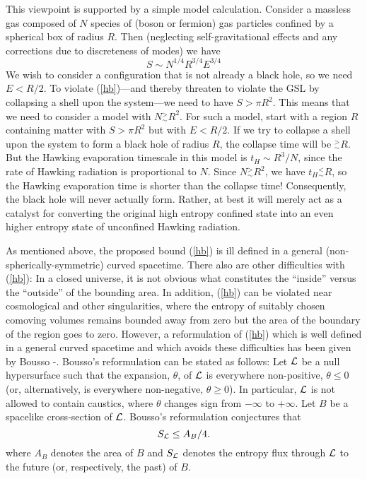 This viewpoint is supported by a simple model calculation.  Consider a
massless gas composed of $N$ species of (boson or fermion) gas
particles confined by a spherical box of radius $R$. Then (neglecting
self-gravitational effects and any corrections due to discreteness of
modes) we have
\begin{equation}
S \sim N^{1/4} R^{3/4} E^{3/4}
\label{sgas}
\end{equation}
We wish to consider a configuration that is not already a black hole,
so we need $E < R/2$. To violate (\ref{hb})---and thereby threaten to
violate the GSL by collapsing a shell upon the system---we need to
have $S > \pi R^2$. This means that we need to consider a model with
$N \mathrel{{}^>_\sim} R^2$. For such a model, start with a region $R$
containing matter with $S > \pi R^2$ but with $E < R/2$. If we try to
collapse a shell upon the system to form a black hole of radius $R$,
the collapse time will be $\mathrel{{}^>_\sim} R$. But the Hawking
evaporation timescale in this model is $t_H \sim R^3/N$, since the rate
of Hawking radiation is proportional to $N$. Since $N
\mathrel{{}^>_\sim} R^2$, we have $t_H \mathrel{{}^<_\sim} R$, so the
Hawking evaporation time is shorter than the collapse
time! Consequently, the black hole will never actually form. Rather,
at best it will merely act as a catalyst for converting the original high
entropy confined state into an even higher entropy state of unconfined
Hawking radiation.

As mentioned above, the proposed bound (\ref{hb}) is ill defined in a
general (non-spherically-symmetric) curved spacetime. There also are
other difficulties with (\ref{hb}): In a closed universe, it is not
obvious what constitutes the ``inside'' versus the ``outside'' of the
bounding area. In addition, (\ref{hb}) can be violated near
cosmological and other singularities, where the entropy of suitably
chosen comoving volumes remains bounded away from zero but the area of
the boundary of the region goes to zero.  However, a reformulation of
(\ref{hb}) which is well defined in a general curved spacetime and
which avoids these difficulties has been given by Bousso
\cite{bo1}-\cite{bo3}. Bousso's reformulation can be stated as
follows: Let ${\cal L}$ be a null hypersurface such that the
expansion, $\theta$, of ${\cal L}$ is everywhere non-positive, $\theta
\leq 0$ (or, alternatively, is everywhere non-negative, $\theta \geq
0$). In particular, ${\cal L}$ is not allowed to contain caustics,
where $\theta$ changes sign from $- \infty$ to $+\infty$. Let $B$ be a
spacelike cross-section of $\cal L$. Bousso's reformulation
conjectures that
\begin{equation}
S_{\cal L} \leq A_B/4 .
\label{bb}
\end{equation}
where $A_B$ denotes the area of $B$ and $S_{\cal L}$ denotes the
entropy flux through ${\cal L}$ to the future (or, respectively, the
past) of $B$.


